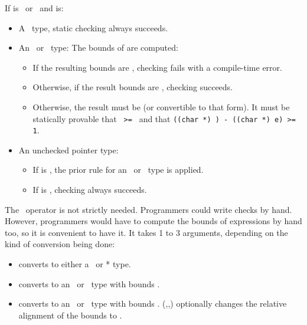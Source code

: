 If  is \ptrvoid\ or \uncheckedptrvoid\ and  is:
\begin{itemize}
\item A \ptr\ type, static checking always succeeds.
\item An \arrayptr\ or \spanptr\ type: The bounds of  are computed:
\begin{itemize}
\item If the resulting bounds are \boundsnone, checking fails with a compile-time
error.
\item Otherwise, if the result bounds are \boundsany, checking 
succeeds.
\item Otherwise, the result must be  (or convertible
to that form).   It must be statically provable that \texttt{ >= }
and that {\texttt{((char *) ) - ((char *) e) >= 1}}.   
\end{itemize}
\item An unchecked pointer type:
\begin{itemize}
\item If  is \ptrvoid, the prior rule for an \arrayptr\ or \spanptr\ type is
applied.
\item If  is \uncheckedptrvoid, checking always succeeds.
\end{itemize}
\end{itemize}

The \dynamicboundscast\ operator is not strictly needed.
Programmers could write checks by hand.  However, programmers
would have to compute the bounds of expressions by hand too, so it is convenient to
have it. It takes 1 to 3 arguments, depending on the kind of conversion being done:
\begin{itemize}
\item
  converts  to either a \ptr\ or * type.
\item
   converts  to an \arrayptr\ or
  \spanptr\ type with bounds .  
\item
   converts  to an
  \arrayptr\ or \spanptr\ type with bounds
  .  
  {(,,)}
   optionally changes the relative alignment of the bounds to .
\end{itemize}

